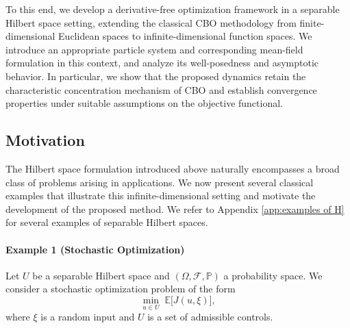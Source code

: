 \documentclass[12pt]{amsart}
\numberwithin{equation}{section}
\begin{document}
To this end, we develop a derivative-free optimization framework in a separable Hilbert space setting, extending the classical CBO methodology from finite-dimensional Euclidean spaces to infinite-dimensional function spaces. We introduce an appropriate particle system and corresponding mean-field formulation in this context, and analyze its well-posedness and asymptotic behavior. In particular, we show that the proposed dynamics retain the characteristic concentration mechanism of CBO and establish convergence properties under suitable assumptions on the objective functional.

\subsection{Motivation}

The Hilbert space formulation introduced above naturally encompasses a broad class of problems arising in applications. We now present several classical examples that illustrate this infinite-dimensional setting and motivate the development of the proposed method. We refer to Appendix \ref{app:examples of H} for several examples of separable Hilbert spaces. 

\paragraph{\textbf{Example 1} (Stochastic Optimization)}

Let $U$ be a separable Hilbert space and $(\Omega,\mathcal{F},\mathbb{P})$ a probability space. We consider a stochastic optimization problem of the form
\[
    \min_{u \in U} \; \mathbb{E}\big[ J(u, \xi) \big],
\]
where $\xi$ is a random input and $U$ is a set of admissible controls.
\end{document}
